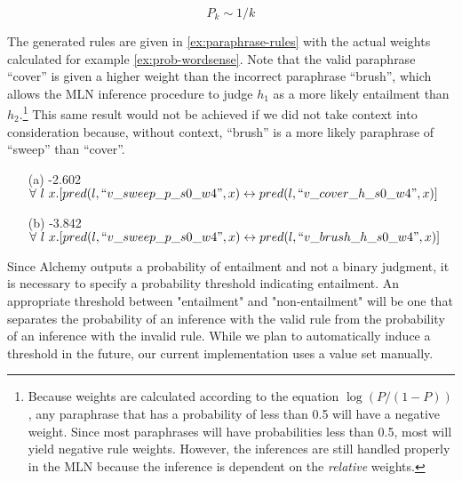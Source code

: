 \begin{equation}\label{eq:zipf}
P_k \sim 1/k
\end{equation}


The generated rules are given in \eqref{ex:paraphrase-rules} with the actual
weights calculated for example \eqref{ex:prob-wordsense}.  Note that the
valid paraphrase ``cover'' is given a higher weight than the incorrect 
paraphrase ``brush'', which allows the MLN inference procedure to judge $h_1$ as
a more likely entailment than $h_2$.\footnote{
Because weights are calculated according to the equation $\log(P/(1-P))$, any
paraphrase that has a probability of less than 0.5 will have a negative weight. 
Since most paraphrases will have probabilities less than 0.5, most will yield
negative rule weights.  However, the inferences are still handled properly in
the MLN because the inference is dependent on the {\em relative} weights.}
This same result would not be achieved if we did not take context into
consideration because, without context, ``brush'' is a more likely paraphrase of
``sweep'' than ``cover''.

\begin{example}\label{ex:paraphrase-rules}
\begin{itemize}
  \item[(a)] -2.602~ $\forall~l~x.[pred(l,``v\_sweep\_p\_s0\_w4",x) \leftrightarrow pred(l,``v\_cover\_h\_s0\_w4",x)]$
  \item[(b)] -3.842~ $\forall~l~x.[pred(l,``v\_sweep\_p\_s0\_w4",x) \leftrightarrow pred(l,``v\_brush\_h\_s0\_w4",x)]$
\end{itemize}
\end{example}

Since Alchemy outputs a probability of entailment and not a binary judgment, it
is necessary to specify a probability threshold indicating entailment.  
An appropriate threshold between "entailment" and "non-entailment" will be one
that separates the probability of an inference with the valid rule from the
probability of an inference with the invalid rule.  
While we plan to automatically induce a threshold in the future, our current
implementation uses a value set manually.


